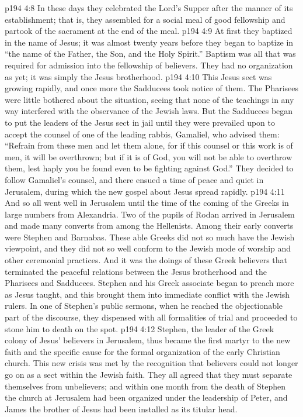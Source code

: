 \pc \vs p194 4:8 In these days they celebrated the Lord’s Supper after the manner of its establishment; that is, they assembled for a social meal of good fellowship and partook of the sacrament at the end of the meal.
\pc \vs p194 4:9 At first they baptized in the name of Jesus; it was almost twenty years before they began to baptize in “the name of the Father, the Son, and the Holy Spirit.” Baptism was all that was required for admission into the fellowship of believers. They had no organization as yet; it was simply the Jesus brotherhood.
\pc \vs p194 4:10 This Jesus sect was growing rapidly, and once more the Sadducees took notice of them. The Pharisees were little bothered about the situation, seeing that none of the teachings in any way interfered with the observance of the Jewish laws. But the Sadducees began to put the leaders of the Jesus sect in jail until they were prevailed upon to accept the counsel of one of the leading rabbis, Gamaliel, who advised them: “Refrain from these men and let them alone, for if this counsel or this work is of men, it will be overthrown; but if it is of God, you will not be able to overthrow them, lest haply you be found even to be fighting against God.” They decided to follow Gamaliel’s counsel, and there ensued a time of peace and quiet in Jerusalem, during which the new gospel about Jesus spread rapidly.
\vs p194 4:11 And so all went well in Jerusalem until the time of the coming of the Greeks in large numbers from Alexandria. Two of the pupils of Rodan arrived in Jerusalem and made many converts from among the Hellenists. Among their early converts were Stephen and Barnabas. These able Greeks did not so much have the Jewish viewpoint, and they did not so well conform to the Jewish mode of worship and other ceremonial practices. And it was the doings of these Greek believers that terminated the peaceful relations between the Jesus brotherhood and the Pharisees and Sadducees. Stephen and his Greek associate began to preach more as Jesus taught, and this brought them into immediate conflict with the Jewish rulers. In one of Stephen’s public sermons, when he reached the objectionable part of the discourse, they dispensed with all formalities of trial and proceeded to stone him to death on the spot.
\vs p194 4:12 Stephen, the leader of the Greek colony of Jesus’ believers in Jerusalem, thus became the first martyr to the new faith and the specific cause for the formal organization of the early Christian church. This new crisis was met by the recognition that believers could not longer go on as a sect within the Jewish faith. They all agreed that they must separate themselves from unbelievers; and within one month from the death of Stephen the church at Jerusalem had been organized under the leadership of Peter, and James the brother of Jesus had been installed as its titular head.
